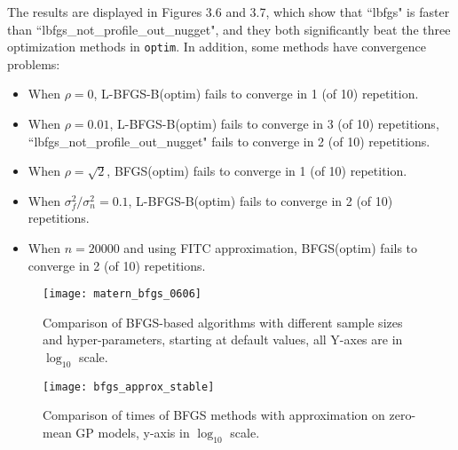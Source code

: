 The results are displayed in Figures 3.6 and 3.7, which show that ``lbfgs" is faster than ``lbfgs\_not\_profile\_out\_nugget", and they both significantly beat the three optimization methods in \texttt{optim}. In addition, some methods have convergence problems:

\begin{itemize}
    \item When $\rho=0$, L-BFGS-B(optim) fails to converge in 1 (of 10) repetition.
    \item When $\rho=0.01$, L-BFGS-B(optim) fails to converge in 3 (of 10) repetitions, ``lbfgs\_not\_profile\_out\_nugget" fails to converge in 2 (of 10) repetitions.
    \item When $\rho=\sqrt{2}$, BFGS(optim) fails to converge in 1 (of 10) repetition.
    \item When $\sigma^2_f/\sigma^2_n = 0.1$, L-BFGS-B(optim) fails to converge in 2 (of 10) repetitions.
    \item When $n=20000$ and using FITC approximation, BFGS(optim) fails to converge in 2 (of 10) repetitions.
\end{itemize}

\begin{figure}[hbt!]%
  \centering
  \texttt{[image: matern\_bfgs\_0606]} %
  \caption[Comparison of BFGS variants: times of GP-Matern starting at default values: line graphs with range bars]%
  {Comparison of BFGS-based algorithms with different sample sizes and hyper-parameters, starting at default values, all Y-axes are in $\log_{10}$ scale.}%
  \label{fig:matern_bfgs}
\end{figure}

\begin{figure}[hbt!]%
  \centering
  \texttt{[image: bfgs\_approx\_stable]} %
  \caption[Comparison of BFGS variants with approximation: times of GP-Matern starting at default values: line graphs with range bars]%
  {Comparison of times of BFGS methods with approximation on zero-mean GP models, y-axis in $\log_{10}$ scale.}%
  \label{fig:linear_iteration}
\end{figure}


